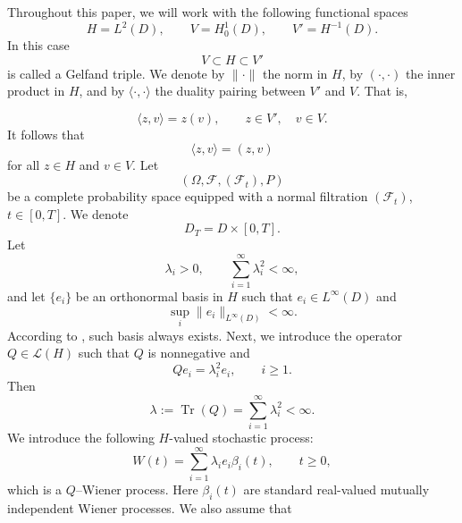 \documentclass[a4paper,12pt]{article}
\numberwithin{equation}{section}
\begin{document}
Throughout this paper, we will work with the following functional spaces
\[
H=L^2(D),
\qquad
V=H_0^1(D),
\qquad
V'=H^{-1}(D).
\]
In this case
\[
V\subset H\subset V'
\]
is called a Gelfand triple. We denote by $\|\cdot\|$ the norm in
$H$, by $(\cdot,\cdot)$ the inner product in $H$, and by
$\langle\cdot,\cdot\rangle$ the duality pairing between $V'$ and $V$.
That is,

\[
\langle z,v\rangle = z(v),
\qquad
z\in V',
\quad
v\in V.
\]
It follows that
\[
\langle z,v\rangle = (z,v)
\]
for all $z\in H$ and $v\in V$. Let
\[
(\Omega,\mathcal{F},(\mathcal{F}_t),P)
\]
be a complete probability space equipped with a normal filtration
$(\mathcal{F}_t)$, $t\in[0,T]$.
We denote
\[
D_T=D\times[0,T].
\]
Let
\[
\lambda_i>0,
\qquad
\sum_{i=1}^{\infty}\lambda_i^2<\infty,
\]
and let $\{e_i\}$ be an orthonormal basis in $H$ such that $e_i\in L^\infty(D)$ and
\[
\sup_i \|e_i\|_{L^\infty(D)}<\infty.
\]
According to \cite{17}, such basis always exists. Next, we introduce the operator $Q\in\mathcal{L}(H)$
such that $Q$ is nonnegative and
\[
Qe_i=\lambda_i^2 e_i,
\qquad
i\ge 1.
\]
Then
\[
\lambda:=\operatorname{Tr}(Q)
=
\sum_{i=1}^{\infty}\lambda_i^2
<
\infty.
\]
We introduce the following $H$-valued stochastic process:
\begin{equation}
\label{2.1}
W(t)
=
\sum_{i=1}^{\infty}
\lambda_i e_i \beta_i(t),
\qquad
t\ge 0,
\end{equation}
which is a $Q$--Wiener process. Here $\beta_i(t)$ are standard real-valued mutually independent
Wiener processes. We also assume that
\end{document}
